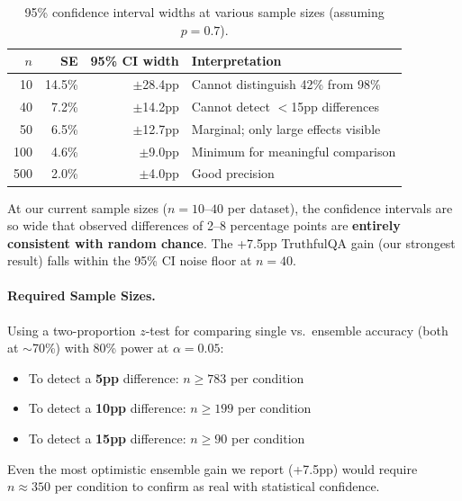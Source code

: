 \documentclass[11pt,a4paper]{article}
\begin{document}
\begin{table}[htbp]
\centering
\caption{95\% confidence interval widths at various sample sizes (assuming $p = 0.7$).}
\label{tab:ci_widths}
\begin{tabular}{rrrl}
\toprule
$n$ & SE & 95\% CI width & Interpretation \\
\midrule
10 & 14.5\% & $\pm$28.4pp & Cannot distinguish 42\% from 98\% \\
40 & 7.2\% & $\pm$14.2pp & Cannot detect $<$15pp differences \\
50 & 6.5\% & $\pm$12.7pp & Marginal; only large effects visible \\
100 & 4.6\% & $\pm$9.0pp & Minimum for meaningful comparison \\
500 & 2.0\% & $\pm$4.0pp & Good precision \\
\bottomrule
\end{tabular}
\end{table}

At our current sample sizes ($n=10$--$40$ per dataset), the confidence intervals are so wide that observed differences of 2--8 percentage points are \textbf{entirely consistent with random chance}.
The +7.5pp TruthfulQA gain (our strongest result) falls within the 95\% CI noise floor at $n=40$.

\paragraph{Required Sample Sizes.}
Using a two-proportion $z$-test for comparing single vs.\ ensemble accuracy (both at $\sim$70\%) with 80\% power at $\alpha = 0.05$:

\begin{itemize}
    \item To detect a \textbf{5pp} difference: $n \geq 783$ per condition
    \item To detect a \textbf{10pp} difference: $n \geq 199$ per condition
    \item To detect a \textbf{15pp} difference: $n \geq 90$ per condition
\end{itemize}

Even the most optimistic ensemble gain we report (+7.5pp) would require $n \approx 350$ per condition to confirm as real with statistical confidence.
\end{document}
